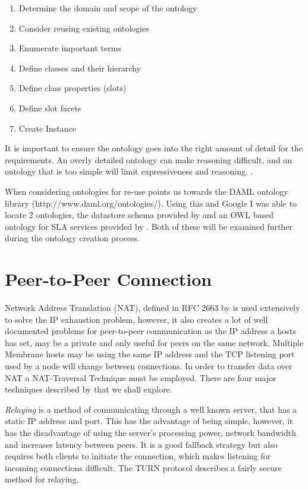 \documentclass[11pt, a4paper, twocolumn, twoside]{report}
\begin{document}
\begin{enumerate}
 \item Determine the domain and scope of the ontology
 \item Consider reusing existing ontologies
 \item Enumerate important terms
 \item Define classes and their hierarchy
 \item Define class properties (slots)
 \item Define slot facets
 \item Create Instance
\end{enumerate}

It is important to ensure the ontology goes into the right amount of detail for the requirements. An overly detailed ontology can make reasoning difficult, and an ontology that is too simple will limit expressiveness and reasoning. \citep*{wooldridge2009introduction, sugumaran2002ontologies}.

When considering ontologies for re-use \cite{noy2001ontology} points us towards the DAML ontology library (http://www.daml.org/ontologies/). Using this and Google I was able to locate 2 ontologies, the datastore schema provided by \cite{w32001datastore} and an OWL based ontology for SLA services provided by \cite{pande2012slaont}. Both of these will be examined further during the ontology creation process.

\section{Peer-to-Peer Connection}

Network Address Translation (NAT), defined in RFC 2663 by \cite{srisuresh1999ip} is used extensively to solve the IP exhaustion problem, however, it also creates a lot of well documented problems for peer-to-peer communication as the IP address a hosts has set, may be a private and only useful for peers on the same network. Multiple Membrane hosts may be using the same IP address and the TCP listening port used by a node will change between connections. In order to transfer data over NAT a NAT-Traversal Technique must be employed. There are four major techniques described by \cite{ford2005peer} that we shall explore.

\emph{Relaying} is a method of communicating through a well known server, that has a static IP address and port. This has the advantage of being simple, however, it has the disadvantage of using the server's processing power, network bandwidth and increases latency between peers. It is a good fallback strategy but also requires both clients to initiate the connection, which makes listening for incoming connections difficult. The TURN protocol \citep{rosenberg2005traversal} describes a fairly secure method for relaying.
\end{document}
